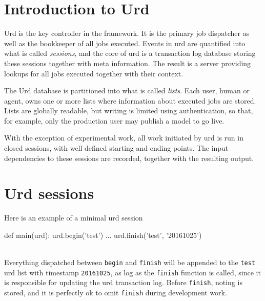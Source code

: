 \section{Introduction to Urd}

Urd is the key controller in the framework.  It is the primary job
dispatcher as well as the bookkeeper of all jobs executed.  Events in
urd are quantified into what is called \textsl{sessions}, and the core
of urd is a transaction log database storing these sessions together
with meta information.  The result is a server providing lookups for
all jobs executed together with their context.

The Urd database is partitioned into what is called \textsl{lists}.
Each user, human or agent, owns one or more lists where information
about executed jobs are stored.  Lists are globally readable, but
writing is limited using authentication, so that, for example, only
the production user may publish a model to go live.

With the exception of experimental work, all work initiated by urd is
run in closed sessions, with well defined starting and ending points.
The input dependencies to these sessions are recorded, together with
the resulting output.



\section{Urd sessions}

Here is an example of a minimal urd session
\\
\begin{python}
def main(urd):
  urd.begin('test')
  ...
  urd.finish('test', '20161025')
\end{python}
\\
Everything dispatched between \texttt{begin} and \texttt{finish} will
be appended to the \texttt{test} urd list with timestamp
\texttt{20161025}, as log as the \texttt{finish} function is called,
since it is responsible for updating the urd transaction log.  Before
\texttt{finish}, noting is stored, and it is perfectly ok to omit
\texttt{finish} during development work.

